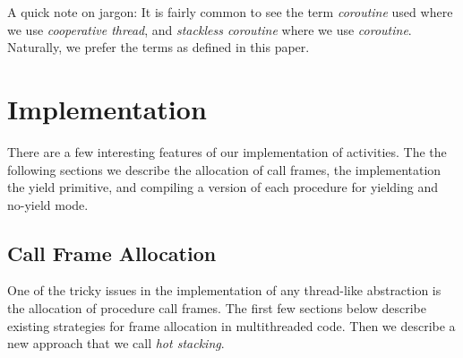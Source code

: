 \documentclass[pldi,10pt,preprint]{sigplanconf-pldi16}
\begin{document}


A quick note on jargon: It is fairly common to see the term \emph{coroutine} used where we use \emph{cooperative thread}, and \emph{stackless coroutine} where we use \emph{coroutine}.
Naturally, we prefer the terms as defined in this paper.

\section{Implementation}

There are a few interesting features of our implementation of activities.
The the following sections we describe the allocation of call frames, the implementation the yield primitive, and compiling a version of each procedure for yielding and no-yield mode.

\subsection{Call Frame Allocation}

One of the tricky issues in the implementation of any thread-like abstraction is the allocation of procedure call frames.
The first few sections below describe existing strategies for frame allocation in multithreaded code.
Then we describe a new approach that we call \emph{hot stacking}.
\end{document}
